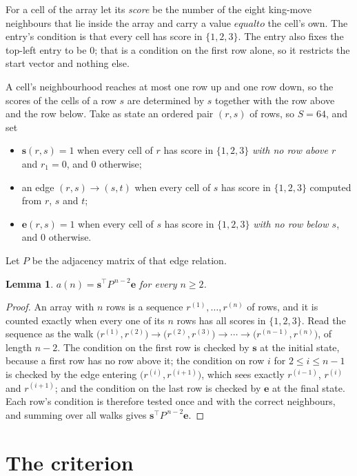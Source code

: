 \documentclass[11pt,a4paper]{article}
\theoremstyle{plain}
\newtheorem{lemma}[theorem]{Lemma}
\theoremstyle{definition}
\begin{document}
For a cell of the array let its \emph{score} be the number of the eight king-move neighbours that lie inside
the array and carry a value $equal to$ the cell's own. The entry's condition is that every cell
has score in $\{1,2,3\}$. The entry also fixes the top-left entry to be $0$; that is a condition on the first row alone, so it restricts the start vector and nothing else.

A cell's neighbourhood reaches at most one row up and one row down, so the scores of the
cells of a row $s$ are determined by $s$ together with the row above and the row below.
Take as state an ordered pair $(r,s)$ of rows, so $S=64$, and set
\begin{itemize}
\item $\mathbf{s}(r,s)=1$ when every cell of $r$ has score in $\{1,2,3\}$ \emph{with no row
above $r$} and $r_1=0$, and $0$ otherwise;
\item an edge $(r,s)\to(s,t)$ when every cell of $s$ has score in $\{1,2,3\}$ computed from
$r$, $s$ and $t$;
\item $\mathbf{e}(r,s)=1$ when every cell of $s$ has score in $\{1,2,3\}$ \emph{with no row
below $s$}, and $0$ otherwise.
\end{itemize}
Let $P$ be the adjacency matrix of that edge relation.

\begin{lemma}\label{lem:walk}
$a(n)=\mathbf{s}^{\!\top}P^{\,n-2}\mathbf{e}$ for every $n\ge2$.
\end{lemma}

\begin{proof}
An array with $n$ rows is a sequence $r^{(1)},\dots,r^{(n)}$ of rows, and it is counted
exactly when every one of its $n$ rows has all scores in $\{1,2,3\}$. Read the sequence as the
walk $\bigl(r^{(1)},r^{(2)}\bigr)\to\bigl(r^{(2)},r^{(3)}\bigr)\to\cdots\to
\bigl(r^{(n-1)},r^{(n)}\bigr)$, of length $n-2$. The condition on the first row is
checked by $\mathbf{s}$ at the initial state, because a first row has no row above it; the
condition on row $i$ for $2\le i\le n-1$ is checked by the edge entering
$\bigl(r^{(i)},r^{(i+1)}\bigr)$, which sees exactly $r^{(i-1)}$, $r^{(i)}$ and
$r^{(i+1)}$; and the condition on the last row is checked by $\mathbf{e}$ at the final
state. Each row's condition is therefore tested once and with the correct neighbours, and
summing over all walks gives $\mathbf{s}^{\!\top}P^{\,n-2}\mathbf{e}$.
\end{proof}

\section{The criterion}
\end{document}
